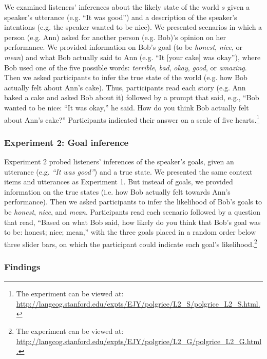 We examined listeners' inferences about the likely state of the world $s$ given a speaker's utterance (e.g. ``It was good'') and a description of the speaker's intentions (e.g. the speaker wanted to be nice). We presented scenarios in which a person (e.g. Ann) asked for another person (e.g. Bob)'s opinion on her performance. We provided information on Bob's goal (to be \emph{honest}, \emph{nice}, or \emph{mean}) and what Bob actually said to Ann (e.g. ``It [your cake] was okay''), where Bob used one of the five possible words: \emph{terrible}, \emph{bad}, \emph{okay}, \emph{good}, or \emph{amazing}. Then we asked participants to infer the true state of the world (e.g. how Bob actually felt about Ann's cake). Thus, participants read each story (e.g. Ann baked a cake and asked Bob about it) followed by a prompt that said,
e.g., ``Bob wanted to be nice: ``It was okay,'' he said. How do you think Bob actually felt about Ann's cake?''
Participants indicated their answer on a scale of five hearts.\footnote{The experiment can be viewed at: \url{http://langcog.stanford.edu/expts/EJY/polgrice/L2_S/polgrice_L2_S.html.}} 

\subsubsection{Experiment 2: Goal inference}

Experiment 2 probed listeners' inferences of the speaker's goals, given an utterance (e.g. \emph{``It was good''}) and a true state. We presented the same context items and utterances as Experiment 1. But instead of goals, we provided information on the true states (i.e. how Bob actually felt towards Ann's performance).
Then we asked participants to infer the likelihood of Bob's goals to be \emph{honest}, \emph{nice}, and \emph{mean}.
Participants read each scenario followed by a question that read, ``Based on what Bob said, how likely do you think that Bob's goal was to be: honest; nice; mean,'' with the three goals placed in a random order below three slider bars, on which the participant could indicate each goal's likelihood.\footnote{The experiment can be viewed at: \url{http://langcog.stanford.edu/expts/EJY/polgrice/L2_G/polgrice_L2_G.html.}}

\subsubsection{Findings}

